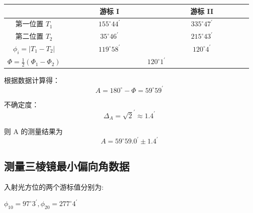 \documentclass[UTF8]{ctexart}
\begin{document}
\begin{center}
    \begin{tabular}{|c|c|c|}
        \hline &  ~~~~~~~~游标 I~~~~~~~~&  ~~~~~~~~游标 II~~~~~~~~ \\
        \hline  第一位置 $ T_{1}$ & $155^{\circ} 44^{\prime}$ & $335^{\circ} 47^{\prime}$ \\
        \hline  第二位置  $T_{2}$ & $35^{\circ} 46^{\prime} $& $215^{\circ} 43^{\prime}$ \\
        \hline $\phi_{i}=\left|T_{1}-T_{2}\right|$ & $119^{\circ} 58^{\prime}$ & $120^{\circ} 4^{\prime}$ \\
        \hline $\Phi=\frac{1}{2}(\Phi_1 -\Phi_2)$&\multicolumn{2}{c|}{$120^{\circ} 1^{\prime} $}\\
        \hline
    \end{tabular}    
\end{center}

根据数据计算得：
$$
A=180^{\circ}-\Phi=59^{\circ} 59^{\prime}  
$$

不确定度：
$$
\Delta_{A}=\sqrt{2}^{\prime} \approx 1.4^{\prime}
$$

则  A  的测量结果为  
$$
A=59^{\circ} 59.0^{\prime} \pm 1.4^{\prime} 
$$

\subsection{测量三棱镜最小偏向角数据}


入射光方位的两个游标值分别为:


$\phi_{10}={97}^{\circ} 3^{\prime}, \phi_{20}={277}^{\circ} 4^{\prime}$
\end{document}
